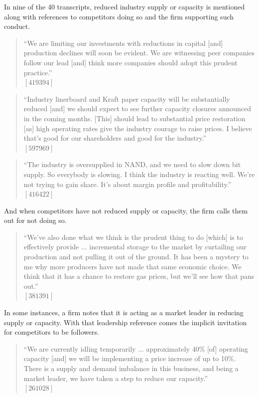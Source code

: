 In nine of the 40 transcripts, reduced industry supply or capacity is mentioned along with references to competitors doing so and the firm supporting such conduct.

\begin{quote}
``We are limiting our investments with reductions in capital [and] production declines will soon be evident. We are witnessing peer companies follow our lead [and] think more companies should adopt this prudent practice.'' \\
$[419394]$
\end{quote}

\begin{quote}
``Industry linerboard and Kraft paper capacity will be substantially reduced [and] we should expect to see further capacity closures announced in the coming months. [This] should lead to substantial price restoration [as] high operating rates give the industry courage to raise prices. I believe that's good for our shareholders and good for the industry.'' \\
$[597969]$
\end{quote}

\begin{quote}
``The industry is oversupplied in NAND, and we need to slow down bit supply. So everybody is slowing. I think the industry is reacting well. We're not trying to gain share. It's about margin profile and profitability.'' \\
$[416422]$
\end{quote}

And when competitors have not reduced supply or capacity, the firm calls them out for not doing so.

\begin{quote}
``We've also done what we think is the prudent thing to do [which] is to effectively provide ... incremental storage to the market by curtailing our production and not pulling it out of the ground. It has been a mystery to me why more producers have not made that same economic choice. We think that it has a chance to restore gas prices, but we'll see how that pans out.'' \\
$[381391]$
\end{quote}

In some instances, a firm notes that it is acting as a market leader in reducing supply or capacity. With that leadership reference comes the implicit invitation for competitors to be followers.

\begin{quote}
``We are currently idling temporarily ... approximately 40\% [of] operating capacity [and] we will be implementing a price increase of up to 10\%. There is a supply and demand imbalance in this business, and being a market leader, we have taken a step to reduce our capacity.'' \\
$[261028]$
\end{quote}

